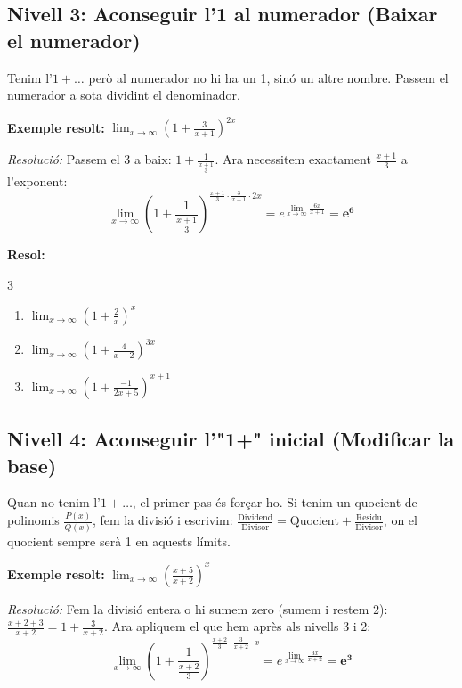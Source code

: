 \documentclass[12pt,a4paper]{article}
\begin{document}
\vspace{0.4cm}
\newpage
\subsection*{Nivell 3: Aconseguir l'1 al numerador (Baixar el numerador)}
Tenim l'$1 + \dots$ però al numerador no hi ha un 1, sinó un altre nombre. Passem el numerador a sota dividint el denominador.

\textbf{Exemple resolt:} $\displaystyle \lim_{x \to \infty} \left( 1 + \frac{3}{x+1} \right)^{2x}$

\textit{Resolució:} Passem el 3 a baix: $1 + \frac{1}{\frac{x+1}{3}}$. Ara necessitem exactament $\frac{x+1}{3}$ a l'exponent:
\[ \lim_{x \to \infty} \left( 1 + \frac{1}{\frac{x+1}{3}} \right)^{ \frac{x+1}{3} \cdot \frac{3}{x+1} \cdot 2x } = e^{ \lim_{x \to \infty} \frac{6x}{x+1} } = \mathbf{e^6} \]

\textbf{Resol:}
\begin{multicols}{3}
\begin{enumerate}[label=3.3.\arabic*.]
    \item $\displaystyle \lim_{x \to \infty} \left( 1 + \frac{2}{x} \right)^x$
    \item $\displaystyle \lim_{x \to \infty} \left( 1 + \frac{4}{x-2} \right)^{3x}$
    \item $\displaystyle \lim_{x \to \infty} \left( 1 + \frac{-1}{2x+5} \right)^{x+1}$
\end{enumerate}
\end{multicols}

\vspace{0.4cm}

\subsection*{Nivell 4: Aconseguir l'"1+" inicial (Modificar la base)}
Quan no tenim l'$1 + \dots$, el primer pas és forçar-ho. Si tenim un quocient de polinomis $\frac{P(x)}{Q(x)}$, fem la divisió i escrivim: $\frac{\text{Dividend}}{\text{Divisor}} = \text{Quocient} + \frac{\text{Residu}}{\text{Divisor}}$, on el quocient sempre serà 1 en aquests límits.

\textbf{Exemple resolt:} $\displaystyle \lim_{x \to \infty} \left( \frac{x+5}{x+2} \right)^x$

\textit{Resolució:} Fem la divisió entera o hi sumem zero (sumem i restem 2): $\frac{x+2+3}{x+2} = 1 + \frac{3}{x+2}$.
Ara apliquem el que hem après als nivells 3 i 2:
\[ \lim_{x \to \infty} \left( 1 + \frac{1}{\frac{x+2}{3}} \right)^{ \frac{x+2}{3} \cdot \frac{3}{x+2} \cdot x } = e^{ \lim_{x \to \infty} \frac{3x}{x+2} } = \mathbf{e^3} \]
\end{document}
